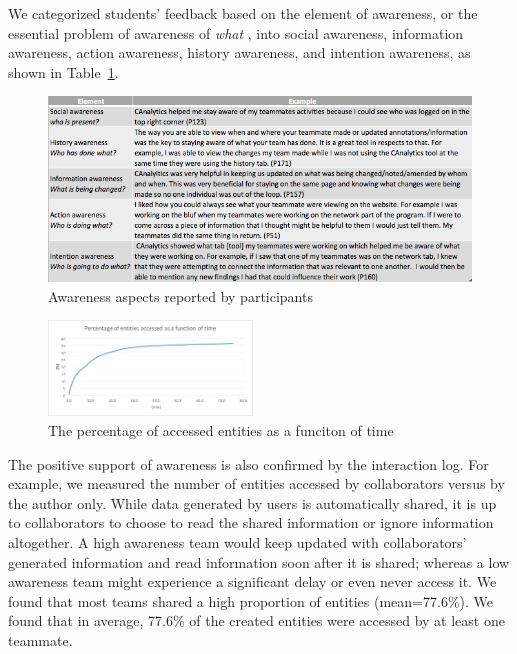 We categorized students' feedback based on the element of awareness, or
the essential problem of awareness of \emph{what}
\autocite{Schmidt2002}, into social awareness, information awareness,
action awareness, history awareness, and intention awareness, as shown
in Table~\ref{tab:awareness}.

\begin{figure}
\centering
\includegraphics[width=6.5in]{./img/awareness.png}
\caption{Awareness aspects reported by
participants}\label{tab:awareness}
\end{figure}

\begin{figure}
\centering
\includegraphics[height=1in]{./img/entity_access_time.jpg}
\caption{The percentage of accessed entities as a funciton of time}\label{fig:access_time}
\end{figure}

The positive support of awareness is also confirmed by the interaction log. For
example, we measured the number of entities accessed by collaborators versus by
the author only. While data generated by users is automatically shared, it is up
to collaborators to choose to read the shared information or ignore information
altogether. A high awareness team would keep updated with collaborators'
generated information and read information soon after it is shared; whereas a
low awareness team might experience a significant delay or even never access it.
We found that most teams shared a high proportion of entities (mean=77.6\%). We
found that in average, 77.6\% of the created entities were accessed by at least
one teammate.

